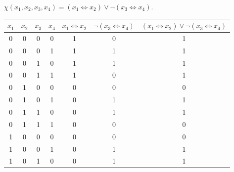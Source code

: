 \begin{example}
    \(\chi(x_1,x_2,x_3,x_4)=(x_1\iff x_2)\lor \neg(x_3\iff x_4)\).
    \begin{table}[ht]
        \centering
        \begin{tabular}{|c|c|c|c|c|c|c|}
        \hline
        $x_1$ & $x_2$ & $x_3$ & $x_4$ & $x_1\iff x_2$ & $\neg(x_3\iff x_4)$ & $(x_1\iff x_2)\lor\neg(x_3\iff x_4)$ \\ \hline
        0     & 0     & 0     & 0     & 1             & 0                                                 & 1                                    \\ \hline
        0     & 0     & 0     & 1     & 1             & 1                                                 & 1                                    \\ \hline
        0     & 0     & 1     & 0     & 1             & 1                                                 & 1                                    \\ \hline
        0     & 0     & 1     & 1     & 1             & 0                                                 & 1                                    \\ \hline
        0     & 1     & 0     & 0     & 0             & 0                                                 & 0                                    \\ \hline
        0     & 1     & 0     & 1     & 0             & 1                                                 & 1                                    \\ \hline
        0     & 1     & 1     & 0     & 0             & 1                                                 & 1                                    \\ \hline
        0     & 1     & 1     & 1     & 0             & 0                                                 & 0                                    \\ \hline
        1     & 0     & 0     & 0     & 0             & 0                                                 & 0                                    \\ \hline
        1     & 0     & 0     & 1     & 0             & 1                                                 & 1                                    \\ \hline
        1     & 0     & 1     & 0     & 0             & 1                                                 & 1                                    \\ \hline

\end{tabular}
\end{table}
\end{example}
